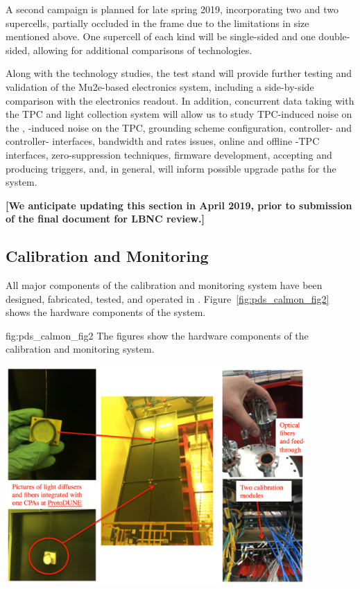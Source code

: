 A second campaign is planned for late spring 2019, incorporating two  and two  supercells, partially occluded in the frame due to the limitations in  size mentioned above.  One supercell of each kind will be single-sided and one double-sided, allowing for additional comparisons of  technologies.

Along with the  technology studies, the test stand will  provide further testing and validation of the  Mu2e-based electronics system, including a side-by-side comparison with the   electronics readout. In addition, concurrent data taking with the TPC and light collection system will allow us to study TPC-induced noise on the , -induced noise on the TPC, grounding scheme configuration, controller- and controller- interfaces, bandwidth and rates issues, online and offline -TPC interfaces, zero-suppression techniques, firmware development, accepting and producing triggers, and, in general, will inform possible upgrade paths for the system. 

{\bf [We anticipate updating this section in April 2019, prior to submission of the final document for LBNC review.]}

\subsection{Calibration and Monitoring}
\label{sec:fdsp-pd-validation-candm}


All major components of the   calibration and monitoring system have been designed, fabricated, tested, and operated in .
Figure~\ref{fig:pds_calmon_fig2} shows the hardware components of the system.

 \begin{dunefigure}
 {fig:pds_calmon_fig2}
 {The figures show the hardware components of the  calibration and monitoring system.}
 \includegraphics[angle=0,width=11.4cm,height=9cm]{graphics/pds-calmon-fig2.png}
\end{dunefigure}

